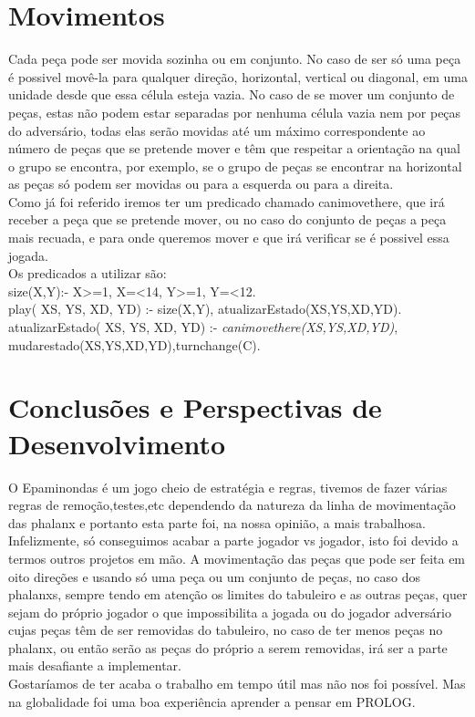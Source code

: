 \documentclass[a4paper]{article}
\begin{document}
\section{Movimentos}
Cada peça pode ser movida sozinha ou em conjunto. No caso de ser só uma peça é possivel movê-la para qualquer direção, horizontal, vertical ou diagonal, em uma unidade desde que essa célula esteja vazia. No caso de se mover um conjunto de peças, estas não podem estar separadas por nenhuma célula vazia nem por peças do adversário, todas elas serão movidas até um máximo correspondente ao número de peças que se pretende mover e têm que respeitar a orientação na qual o grupo se encontra, por exemplo, se o grupo de peças se encontrar na horizontal as peças só podem ser movidas ou para a esquerda ou para a direita.
\\\linebreak
Como já foi referido iremos ter um predicado chamado canimovethere, que irá receber a peça que se pretende mover, ou no caso do conjunto de peças a peça mais recuada, e para onde queremos mover e que irá verificar se é possivel essa jogada.
\\\linebreak
Os predicados a utilizar são:
\\\linebreak
size(X,Y):- X\textgreater=1, X=\textless14, Y\textgreater=1, Y=\textless12.
\\\linebreak
play( XS, YS, XD, YD) :-  size(X,Y), atualizarEstado(XS,YS,XD,YD).
\\\linebreak
atualizarEstado( XS, YS, XD, YD) :- \textit{canimovethere(XS,YS,XD,YD)}, mudarestado(XS,YS,XD,YD),turnchange(C).

\section{Conclusões e Perspectivas de Desenvolvimento}
O Epaminondas é um jogo cheio de estratégia e regras, tivemos de fazer várias regras de remoção,testes,etc dependendo da natureza da linha de movimentação das phalanx e portanto esta parte foi, na nossa opinião, a mais trabalhosa. Infelizmente, só conseguimos acabar a parte jogador vs jogador, isto foi devido a termos outros projetos em mão. A movimentação das peças que pode ser feita em oito direções e usando só uma peça ou um conjunto de peças, no caso dos phalanxs, sempre tendo em atenção os limites do tabuleiro e as outras peças, quer sejam do próprio jogador o que impossibilita a jogada ou do jogador adversário cujas peças têm de ser removidas do tabuleiro, no caso de ter menos peças no phalanx, ou então serão as peças do próprio a serem removidas, irá ser a parte mais desafiante a implementar.
\\\linebreak
Gostaríamos de ter acaba o trabalho em tempo útil mas não nos foi possível. Mas na globalidade foi uma boa experiência aprender a pensar em PROLOG.
\\\linebreak

\clearpage
{}
\renewcommand\refname{Bibliografia}


\end{document}
